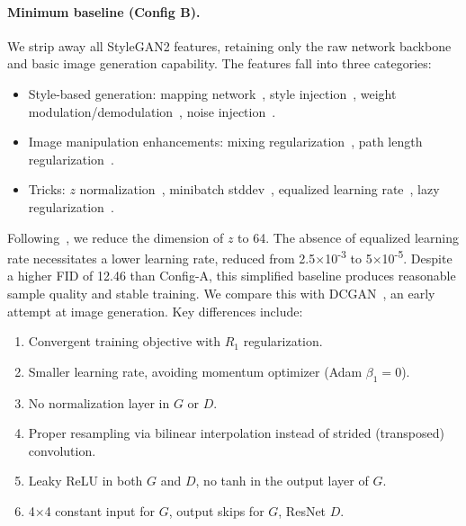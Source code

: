 \vspace{-0.3cm}
\paragraph{Minimum baseline (Config B).}


We strip away all StyleGAN2 features, retaining only the raw network backbone and basic image generation capability. The features fall into three categories:
\begin{itemize}[leftmargin=10pt,itemsep=0pt,topsep=0pt]
\item Style-based generation: mapping network~\cite{sg1}, style injection~\cite{sg1}, weight modulation/demodulation~\cite{sg2}, noise injection~\cite{sg1}.
\end{itemize}\quad %
\begin{itemize}[leftmargin=10pt,itemsep=0pt,topsep=0pt]
\vspace{-0.25cm} %
\item Image manipulation enhancements: mixing regularization~\cite{sg1}, path length regularization~\cite{sg2}.
\item Tricks: $z$ normalization~\cite{pggan}, minibatch stddev~\cite{pggan}, equalized learning rate~\cite{pggan}, lazy regularization~\cite{sg2}.
\end{itemize}

Following~\cite{sgxl,sg-t}, we reduce the dimension of $z$ to 64. The absence of equalized learning rate necessitates a lower learning rate, reduced from 2.5$\times$10\textsuperscript{-3} to 5$\times$10\textsuperscript{-5}. Despite a higher FID of 12.46 than Config-A, this simplified baseline produces reasonable sample quality and stable training. We compare this with DCGAN~\cite{dcgan}, an early attempt at image generation. Key differences include:
\begin{enumerate}[label=\alph*), noitemsep,topsep=0pt,leftmargin=24pt]
\item Convergent training objective with $R_1$ regularization.\label{item:convergent} 
\item Smaller learning rate, avoiding momentum optimizer (Adam $\beta_1=0$).\label{item:learning_rate} 
\item No normalization layer in $G$ or $D$.\label{item:normalization} 
\item Proper resampling via bilinear interpolation instead of strided (transposed) convolution.\label{item:resampling} 
\item Leaky ReLU in both $G$ and $D$, no tanh in the output layer of $G$.\label{item:activation} 
\item 4$\times$4 constant input for $G$, output skips for $G$, ResNet $D$.\label{item:input} 
\end{enumerate}

